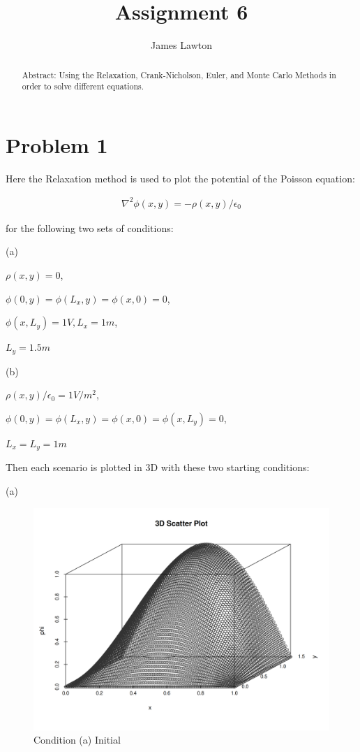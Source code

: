 \documentclass[prb,twocolumn]{revtex4-2}
\begin{document}
\title{Assignment 6}

\author{James Lawton}


\begin{abstract}
Abstract: Using the Relaxation, Crank-Nicholson, Euler, and Monte Carlo Methods
    in order to solve different equations.
\end{abstract}

\maketitle

\section{Problem 1}

\noindent

Here the Relaxation method is used to plot the potential of the Poisson
equation: 

\begin{eqnarray}
\nabla^2 \phi(x, y) = -\rho(x, y)/\epsilon_0
\end{eqnarray}

for the following two sets of conditions:

(a)

$\rho(x, y) = 0$,

$\phi(0, y) = \phi(L_x, y) = \phi(x, 0) = 0$,

$\phi(x, L_y) = 1 V, L_x = 1 m$,

$L_y = 1.5 m$
\label{Poisson Conditions a}

(b)

$\rho(x, y)/\epsilon_0 = 1 V/m^2$,

$\phi(0, y) = \phi(L_x , y) = \phi(x, 0) = \phi(x, L_y ) = 0$,

$L_x = L_y = 1 m$

Then each scenario is plotted in 3D with these two starting conditions:

(a)

\begin{figure}[H]
    \centerline{\includegraphics [width=3 in] {p1/p1a_init.png}}
    \caption{Condition (a) Initial} \label{q1}
\end{figure}
\end{document}
